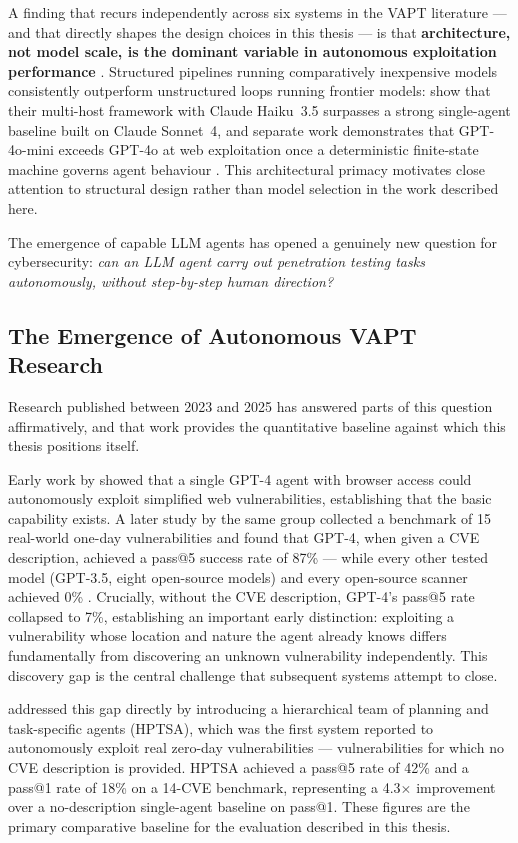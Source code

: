 A finding that recurs independently across six systems in the VAPT literature --- and that directly shapes the design choices in this thesis --- is that \textbf{architecture, not model scale, is the dominant variable in autonomous exploitation performance} \citep{wang2025surveyagents}. Structured pipelines running comparatively inexpensive models consistently outperform unstructured loops running frontier models: \citet{singer2025incalmo} show that their multi-host framework with Claude Haiku~3.5 surpasses a strong single-agent baseline built on Claude Sonnet~4, and separate work demonstrates that GPT-4o-mini exceeds GPT-4o at web exploitation once a deterministic finite-state machine governs agent behaviour \citep{wang2025surveyagents}. This architectural primacy motivates close attention to structural design rather than model selection in the work described here.

The emergence of capable LLM agents has opened a genuinely new question for cybersecurity: \textit{can an LLM agent carry out penetration testing tasks autonomously, without step-by-step human direction?}

\subsection{The Emergence of Autonomous VAPT Research}

Research published between 2023 and 2025 has answered parts of this question affirmatively, and that work provides the quantitative baseline against which this thesis positions itself.

Early work by \citet{fang2024hackwebsites} showed that a single GPT-4 agent with browser access could autonomously exploit simplified web vulnerabilities, establishing that the basic capability exists. A later study by the same group collected a benchmark of 15 real-world one-day vulnerabilities and found that GPT-4, when given a CVE description, achieved a pass@5 success rate of 87\% --- while every other tested model (GPT-3.5, eight open-source models) and every open-source scanner achieved 0\% \citep{fang2024oneday}. Crucially, without the CVE description, GPT-4's pass@5 rate collapsed to 7\%, establishing an important early distinction: exploiting a vulnerability whose location and nature the agent already knows differs fundamentally from discovering an unknown vulnerability independently. This discovery gap is the central challenge that subsequent systems attempt to close.

\citet{zhu2024hptsa} addressed this gap directly by introducing a hierarchical team of planning and task-specific agents (HPTSA), which was the first system reported to autonomously exploit real zero-day vulnerabilities --- vulnerabilities for which no CVE description is provided. HPTSA achieved a pass@5 rate of 42\% and a pass@1 rate of 18\% on a 14-CVE benchmark, representing a 4.3$\times$ improvement over a no-description single-agent baseline on pass@1. These figures are the primary comparative baseline for the evaluation described in this thesis.

